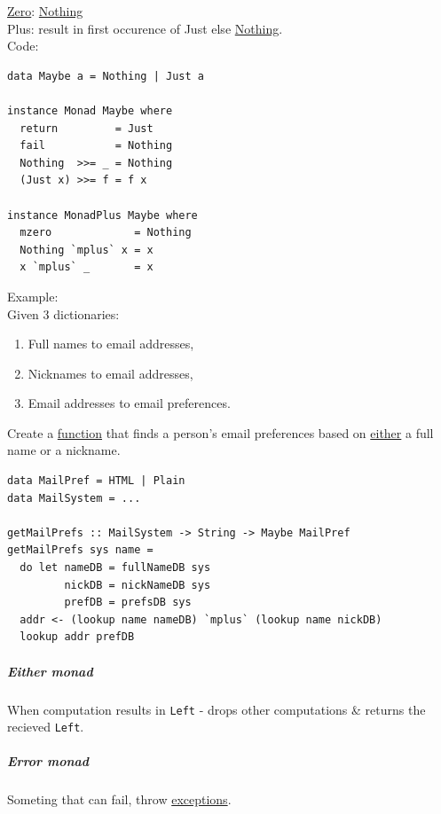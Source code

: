 \documentclass[a4paper,14pt,oneside]{book}
\begin{document}
\hyperref[orgcad07b7]{Zero}: \hyperref[org883e27e]{Nothing}\\
Plus: result in first occurence of Just else \hyperref[org883e27e]{Nothing}.\\

Code:\\
\begin{verbatim}
data Maybe a = Nothing | Just a

instance Monad Maybe where
  return         = Just
  fail           = Nothing
  Nothing  >>= _ = Nothing
  (Just x) >>= f = f x

instance MonadPlus Maybe where
  mzero             = Nothing
  Nothing `mplus` x = x
  x `mplus` _       = x
\end{verbatim}

Example:\\
Given 3 dictionaries:\\
\begin{enumerate}
\item Full names to email addresses,\\
\item Nicknames to email addresses,\\
\item Email addresses to email preferences.\\
\end{enumerate}

Create a \hyperref[org25ee224]{function} that finds a person's email preferences based on \hyperref[org742f4bf]{either} a full name or a nickname.\\
\begin{verbatim}
data MailPref = HTML | Plain
data MailSystem = ...

getMailPrefs :: MailSystem -> String -> Maybe MailPref
getMailPrefs sys name =
  do let nameDB = fullNameDB sys
         nickDB = nickNameDB sys
         prefDB = prefsDB sys
  addr <- (lookup name nameDB) `mplus` (lookup name nickDB)
  lookup addr prefDB
\end{verbatim}

\subparagraph{\label{org0124681}Either monad}
\label{sec:org18b443c}
When computation results in \texttt{Left} - drops other computations \& returns the recieved \texttt{Left}.\\

\subparagraph{\label{org2efe953}Error monad}
\label{sec:org2294ba2}
Someting that can fail, throw \hyperref[orgc7759f7]{exceptions}.\\
\end{document}
